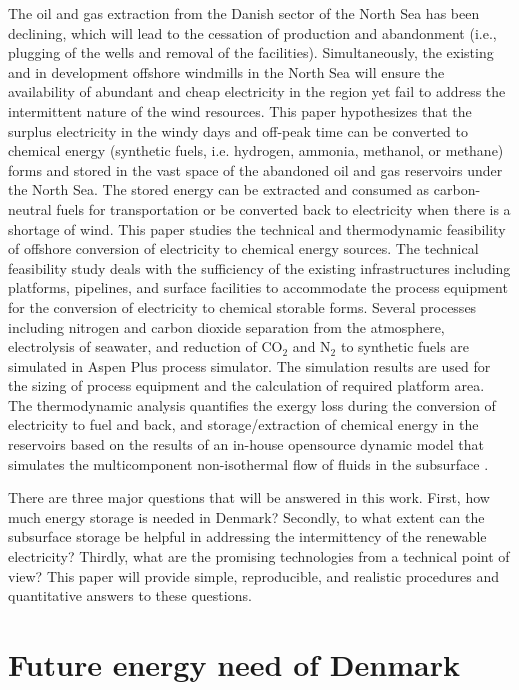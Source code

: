 \documentclass{ECOS_2021}
\begin{document}
The oil and gas extraction from the Danish sector of the North Sea
has been declining, which will lead to the cessation of production
and abandonment (i.e., plugging of the wells and removal of the facilities).
Simultaneously, the existing and in development offshore windmills
in the North Sea will ensure the availability of abundant and cheap
electricity in the region yet fail to address the intermittent nature
of the wind resources. This paper hypothesizes that the surplus electricity
in the windy days and off-peak time can be converted to chemical energy
(synthetic fuels, i.e. hydrogen, ammonia, methanol, or methane) forms
and stored in the vast space of the abandoned oil and gas reservoirs
under the North Sea. The stored energy can be extracted and consumed
as carbon-neutral fuels for transportation or be converted back to
electricity when there is a shortage of wind. This paper studies the
technical and thermodynamic feasibility of offshore conversion of
electricity to chemical energy sources. The technical feasibility
study deals with the sufficiency of the existing infrastructures including
platforms, pipelines, and surface facilities to accommodate the process
equipment for the conversion of electricity to chemical storable forms.
Several processes including nitrogen and carbon dioxide separation
from the atmosphere, electrolysis of seawater, and reduction of CO$_{2}$
and N$_{2}$ to synthetic fuels are simulated in Aspen Plus process
simulator. The simulation results are used for the sizing of process
equipment and the calculation of required platform area. The thermodynamic
analysis quantifies the exergy loss during the conversion of electricity
to fuel and back, and storage/extraction of chemical energy in the
reservoirs based on the results of an in-house opensource dynamic
model that simulates the multicomponent non-isothermal flow of fluids
in the subsurface \cite{eftekhariFVToolFiniteVolume2015b}.

There are three major questions that will be answered in this work.
First, how much energy storage is needed in Denmark? Secondly, to
what extent can the subsurface storage be helpful in addressing the
intermittency of the renewable electricity? Thirdly, what are the
promising technologies from a technical point of view? This paper
will provide simple, reproducible, and realistic procedures and quantitative
answers to these questions.

\sffamily \section{Future energy need of Denmark}
\normalsize
\end{document}
